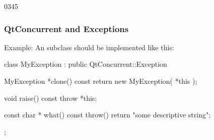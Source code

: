 \begin{slide}[fragile]{0345}
\frametitle{QtConcurrent and Exceptions}
  Example: An  subclass should be
  implemented like this:
\begin{cpp}
class MyException : public QtConcurrent::Exception {

  MyException *clone() const {
    return new MyException( *this );
  }

  void raise() const { throw *this; }

  const char * what() const throw() {
    return "some descriptive string";
  }
};
\end{cpp}
\end{slide}

